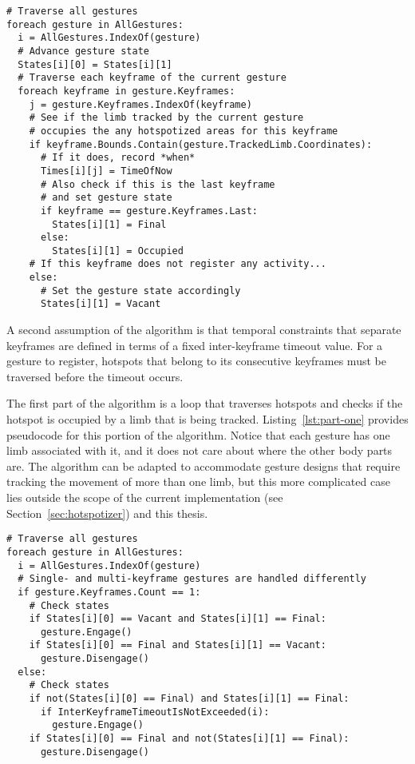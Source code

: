 \begin{lstlisting}[float=t, label=lst:part-one, caption=Part 1 of pseudocode for gesture spotting in discretized space. This part of the algorithm records the traversal of hotspots.]
# Traverse all gestures
foreach gesture in AllGestures:
  i = AllGestures.IndexOf(gesture)
  # Advance gesture state
  States[i][0] = States[i][1]
  # Traverse each keyframe of the current gesture
  foreach keyframe in gesture.Keyframes:
    j = gesture.Keyframes.IndexOf(keyframe)
    # See if the limb tracked by the current gesture
    # occupies the any hotspotized areas for this keyframe
    if keyframe.Bounds.Contain(gesture.TrackedLimb.Coordinates):
      # If it does, record *when*
      Times[i][j] = TimeOfNow
      # Also check if this is the last keyframe
      # and set gesture state
      if keyframe == gesture.Keyframes.Last:
        States[i][1] = Final
      else:
        States[i][1] = Occupied
    # If this keyframe does not register any activity...
    else:
      # Set the gesture state accordingly
      States[i][1] = Vacant
\end{lstlisting}

A second assumption of the algorithm is that temporal constraints that separate keyframes are defined in terms of a fixed inter-keyframe timeout value. For a gesture to register, hotspots that belong to its consecutive keyframes must be traversed before the timeout occurs.

The first part of the algorithm is a loop that traverses hotspots and checks if the hotspot is occupied by a limb that is being tracked. Listing~\ref{lst:part-one} provides pseudocode for this portion of the algorithm. Notice that each gesture has one limb associated with it, and it does not care about where the other body parts are. The algorithm can be adapted to accommodate gesture designs that require tracking the movement of more than one limb, but this more complicated case lies outside the scope of the current implementation (see Section~\ref{sec:hotspotizer}) and this thesis.

\begin{lstlisting}[float=t, label=lst:part-two, caption=Part 2 of pseudocode for gesture spotting in discretized space. This part of the algorithm determines whether the previously recorded activity should trigger any of the gestures we are spotting for.]
# Traverse all gestures
foreach gesture in AllGestures:
  i = AllGestures.IndexOf(gesture)
  # Single- and multi-keyframe gestures are handled differently
  if gesture.Keyframes.Count == 1:
    # Check states
    if States[i][0] == Vacant and States[i][1] == Final:
      gesture.Engage()
    if States[i][0] == Final and States[i][1] == Vacant:
      gesture.Disengage()
  else:
    # Check states
    if not(States[i][0] == Final) and States[i][1] == Final:
      if InterKeyframeTimeoutIsNotExceeded(i):
        gesture.Engage()
    if States[i][0] == Final and not(States[i][1] == Final):
      gesture.Disengage()
\end{lstlisting}

